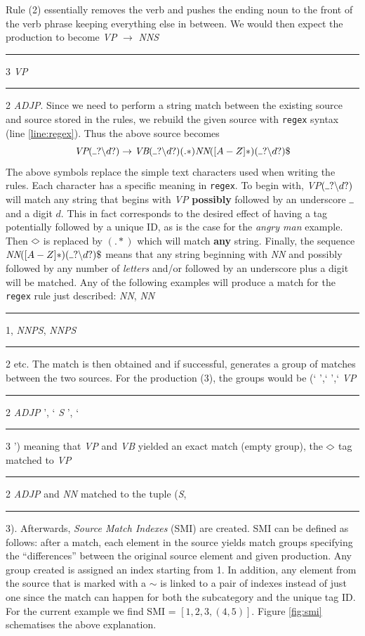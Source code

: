 \documentclass[12pt]{ociamthesis}  %
\newcommand{\anything}{\mathbin{\rotatebox[origin=c]{90}{$\lozenge$}}}
\newcommand{\Sub}{\rule{1ex}{0.4pt}}
\begin{document}
Rule (2) essentially removes the verb and pushes the ending noun to the front of the verb phrase keeping everything else in between. We would then expect the production to become \textit{VP} $\rightarrow$ \textit{NNS}\Sub 3 \textit{VP}\Sub 2 \textit{ADJP}. Since we need to perform a string match between the existing source and source stored in the rules, we rebuild the given source with \texttt{regex} syntax (line \ref{line:regex}). Thus the above source becomes
\[
	\textit{VP}(\Sub?\backslash d?) \rightarrow \textit{VB}(\Sub?\backslash d?)(.*)\textit{NN}([A-Z]*)(\Sub?\backslash d?)\$
\]
The above symbols replace the simple text characters used when writing the rules. Each character has a specific meaning in \texttt{regex}. To begin with, \textit{VP}$(\Sub?\backslash d?)$ will match any string that begins with \textit{VP} \textbf{possibly} followed by an underscore $\Sub$ and a digit $d$. This in fact corresponds to the desired effect of having a tag potentially followed by a unique ID, as is the case for the \textit{angry man} example. Then $\anything$ is replaced by $(.*)$ which will match \textbf{any} string. Finally, the sequence $\textit{NN}([A-Z]*)(\Sub?\backslash d?)\$$ means that any string beginning with \textit{NN} and possibly followed by any number of \textit{letters} and/or followed by an underscore plus a digit will be matched. Any of the following examples will produce a match for the \texttt{regex} rule just described: \textit{NN}, \textit{NN}\Sub1, \textit{NNPS}, \textit{NNPS}\Sub2 etc. The match is then obtained and if successful, generates a group of matches between the two sources. For the production (3), the groups would be (` ',` ',` \textit{VP}\Sub2 \;  \textit{ADJP} ', ` \textit{S} ', ` \Sub 3 ') meaning that \textit{VP} and \textit{VB} yielded an exact match (empty group), the $\anything$ tag matched to \textit{VP}\Sub2 \;  \textit{ADJP} and \textit{NN} matched to the tuple (\textit{S}, \Sub 3). Afterwards,  \textit{Source Match Indexes} (SMI) are created. SMI can be defined as follows: after a match, each element in the source yields match groups specifying the ``differences'' between the original source element and given production. Any group created is assigned an index starting from 1. In addition, any element from the source that is marked with a $\sim$ is linked to a pair of indexes instead of just one since the match can happen for both the subcategory and the unique tag ID. For the current example we find SMI = $[1, 2, 3, (4,5)]$. Figure \ref{fig:smi} schematises the above explanation.
\end{document}

